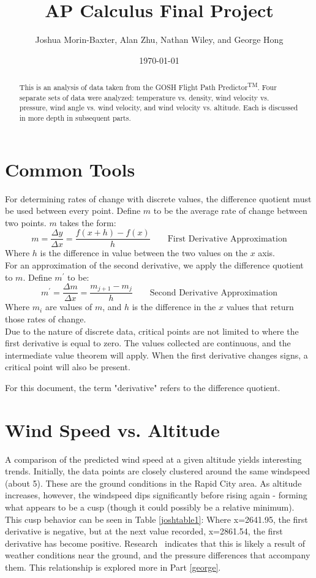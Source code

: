 \documentclass{article}
\begin{document}
\title{AP Calculus Final Project}
\author{Joshua Morin-Baxter, Alan Zhu, Nathan Wiley, and George Hong}
\date{\today}

\maketitle

\begin{abstract}
This is an analysis of data taken from the GOSH Flight Path Predictor\textsuperscript{TM}.  Four separate sets of data were analyzed: temperature vs. density, wind velocity vs. pressure, wind angle vs. wind velocity, and wind velocity vs. altitude. Each is discussed in more depth in subsequent parts.
\end{abstract}
\part{Common Tools}
For determining rates of change with discrete values, the difference quotient must be used between every point.  Define $m$ to be the average rate of change between two points.  $m$ takes the form:
$$m=\frac{\Delta y}{\Delta x}=\frac{f(x+h)-f(x)}{h}\qquad\text{First Derivative Approximation}$$
Where $h$ is the difference in value between the two values on the $x$ axis.
\\For an approximation of the second derivative, we apply the difference quotient to $m$.  Define $m^\prime$ to be:
$$m^\prime=\frac{\Delta m}{\Delta x}=\frac{m_{j+1}-m_j}{h}\qquad\text{Second Derivative Approximation}$$
Where $m_i$ are values of $m$, and $h$ is the difference in the $x$ values that return those rates of change.\\
Due to the nature of discrete data, critical points are not limited to where the first derivative is equal to zero.  The values collected are continuous, and the intermediate value theorem will apply.  When the first derivative changes signs, a critical point will also be present.
\begin{flushleft}
For this document, the term "derivative" refers to the difference quotient.
\end{flushleft}



\part{Wind Speed vs. Altitude}
A comparison of the predicted wind speed at a given altitude yields interesting trends.  Initially, the data points are closely clustered around the same windspeed (about 5\si{}).  These are the ground conditions in the Rapid City area.  As altitude increases, however, the windspeed dips significantly before rising again - forming what appears to be a cusp (though it could possibly be a relative minimum).  This cusp behavior can be seen in Table \ref{joshtable1}: Where x=2641.95, the first derivative is negative, but at the next value recorded, x=2861.54, the first derivative has become positive.  Research~\cite{notes} indicates that this is likely a result of weather conditions near the ground, and the pressure differences that accompany them.  This relationship is explored more in Part \ref{george}.
\end{document}
